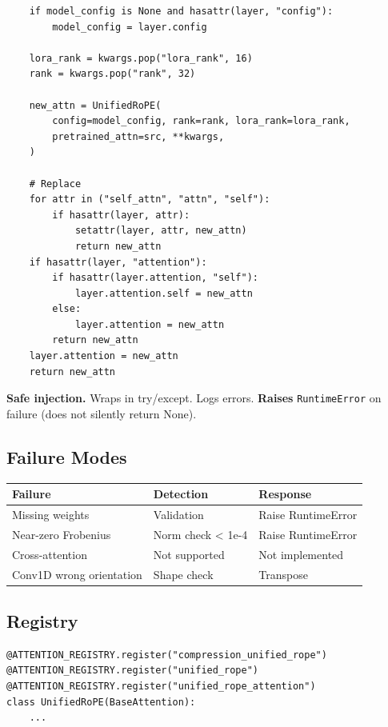 {\begin{lstlisting}
    if model_config is None and hasattr(layer, "config"):
        model_config = layer.config
    
    lora_rank = kwargs.pop("lora_rank", 16)
    rank = kwargs.pop("rank", 32)
    
    new_attn = UnifiedRoPE(
        config=model_config, rank=rank, lora_rank=lora_rank,
        pretrained_attn=src, **kwargs,
    )
    
    # Replace
    for attr in ("self_attn", "attn", "self"):
        if hasattr(layer, attr):
            setattr(layer, attr, new_attn)
            return new_attn
    if hasattr(layer, "attention"):
        if hasattr(layer.attention, "self"):
            layer.attention.self = new_attn
        else:
            layer.attention = new_attn
        return new_attn
    layer.attention = new_attn
    return new_attn
\end{lstlisting}

\textbf{Safe injection.} Wraps in try/except. Logs errors. \textbf{Raises} 
\texttt{RuntimeError} on failure (does not silently return None).

\subsection{Failure Modes}

\begin{table}[H]
\centering
\small
\begin{tabular}{lll}
\toprule
\textbf{Failure} & \textbf{Detection} & \textbf{Response} \\
\midrule
Missing weights & Validation & Raise RuntimeError \\
Near-zero Frobenius & Norm check < 1e-4 & Raise RuntimeError \\
Cross-attention & Not supported & Not implemented \\
Conv1D wrong orientation & Shape check & Transpose \\
\bottomrule
\end{tabular}
\end{table}

\subsection{Registry}

\begin{lstlisting}
@ATTENTION_REGISTRY.register("compression_unified_rope")
@ATTENTION_REGISTRY.register("unified_rope")
@ATTENTION_REGISTRY.register("unified_rope_attention")
class UnifiedRoPE(BaseAttention):
    ...


\end{lstlisting}}
